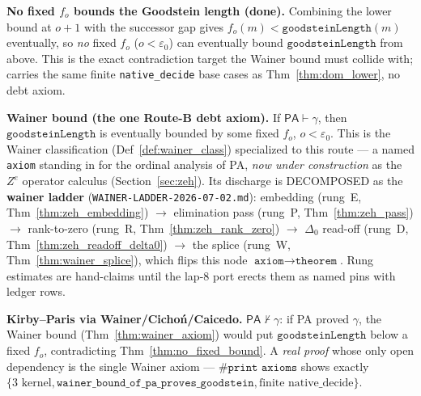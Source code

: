 \begin{theorem}\label{thm:no_fixed_bound}
  \leanok
\textbf{No fixed \(f_o\) bounds the Goodstein length (done).}  Combining the lower bound at \(o+1\) with
the successor gap gives \(f_o(m) < \texttt{goodsteinLength}(m)\) eventually, so \emph{no} fixed
\(f_o\) (\(o<\varepsilon_0\)) can eventually bound \(\texttt{goodsteinLength}\) from above.  This is the
exact contradiction target the Wainer bound must collide with; carries the same finite
\texttt{native\_decide} base cases as Thm~\ref{thm:dom_lower}, no debt axiom.
\end{theorem}

\begin{theorem}\label{thm:wainer_axiom}
  \notready
\textbf{Wainer bound (the one Route-B debt axiom).}  If \(\mathsf{PA}\vdash\gamma\), then
\(\texttt{goodsteinLength}\) is eventually bounded by some fixed \(f_o\), \(o<\varepsilon_0\).  This is
the Wainer classification (Def~\ref{def:wainer_class}) specialized to this route --- a named
\texttt{axiom} standing in for the ordinal analysis of PA, \emph{now under construction} as the
\(Z^{e}\) operator calculus (Section~\ref{sec:zeh}).  Its discharge is DECOMPOSED as the
\textbf{wainer ladder} (\texttt{WAINER-LADDER-2026-07-02.md}): embedding (rung~E,
Thm~\ref{thm:zeh_embedding}) \(\to\) elimination pass (rung~P, Thm~\ref{thm:zeh_pass}) \(\to\)
rank-to-zero (rung~R, Thm~\ref{thm:zeh_rank_zero}) \(\to\) \(\Delta_0\) read-off (rung~D,
Thm~\ref{thm:zeh_readoff_delta0}) \(\to\) the splice (rung~W, Thm~\ref{thm:wainer_splice}), which
flips this node \(\texttt{axiom}\to\texttt{theorem}\).  Rung estimates are hand-claims until the
lap-8 port erects them as named pins with ledger rows.
\end{theorem}

\begin{theorem}\label{thm:routeB_headline}
  \notready
\textbf{Kirby--Paris via Wainer/Cichoń/Caicedo.}  \(\mathsf{PA}\nvdash\gamma\): if PA proved
\(\gamma\), the Wainer bound (Thm~\ref{thm:wainer_axiom}) would put \(\texttt{goodsteinLength}\) below a
fixed \(f_o\), contradicting Thm~\ref{thm:no_fixed_bound}.  A \emph{real proof} whose only open
dependency is the single Wainer axiom --- \(\texttt{\#print axioms}\) shows exactly
\(\{\text{3 kernel}, \texttt{wainer\_bound\_of\_pa\_proves\_goodstein}, \text{finite native\_decide}\}\).
\end{theorem}

